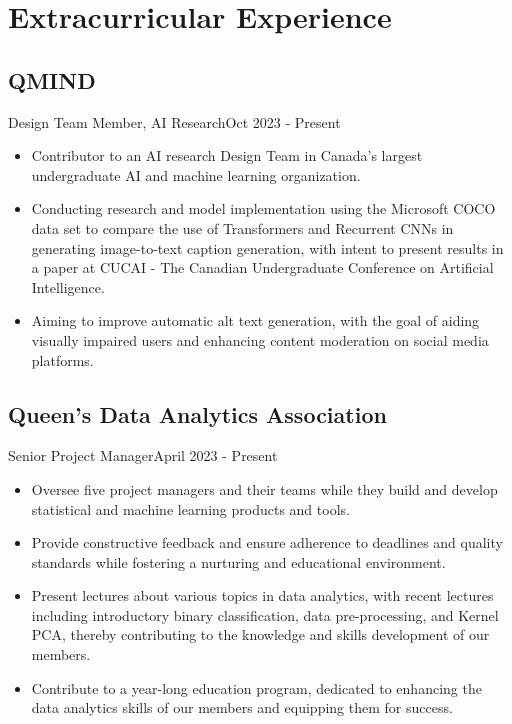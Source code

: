 \section{Extracurricular Experience}
\subsection{QMIND}{Design Team Member, AI Research}{Oct 2023 - Present}
\begin{itemize}
    \item Contributor to an AI research Design Team in Canada’s largest undergraduate AI and machine learning organization. 
    \item Conducting research and model implementation using the Microsoft COCO data set to compare the use of Transformers and Recurrent CNNs in generating image-to-text caption generation, with intent to present results in a paper at CUCAI - The Canadian Undergraduate Conference on Artificial Intelligence.
    \item Aiming to improve automatic alt text generation, with the goal of aiding visually impaired users and enhancing content moderation on social media platforms.
\end{itemize}
\subsection{Queen's Data Analytics Association}{Senior Project Manager}{April 2023 - Present}
\begin{itemize}
    \item Oversee five project managers and their teams while they build and develop statistical and machine learning products and tools.
    \item Provide constructive feedback and ensure adherence to deadlines and quality standards while fostering a nurturing and educational environment.
    \item Present lectures about various topics in data analytics, with recent lectures including introductory binary classification, data pre-processing, and Kernel PCA, thereby contributing to the knowledge and skills development of our members.
    \item Contribute to a year-long education program, dedicated to enhancing the data analytics skills of our members and equipping them for success.
\end{itemize}


